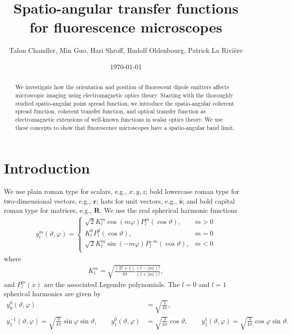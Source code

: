 \documentclass[11pt]{article}
\providecommand{\mb}[1]{\mathbf{#1}}
\begin{document}
\title{\vspace{-2.5em} Spatio-angular transfer functions for fluorescence microscopes\vspace{-1em}}  \author{Talon Chandler, Min Guo, Hari Shroff, Rudolf Oldenbourg, Patrick La Rivi\`ere}
\date{\vspace{-1em}\today\vspace{-1em}}
\maketitle
\begin{abstract}
  We investigate how the orientation and position of fluorescent dipole emitters
  affects microscopic imaging using electromagnetic optics theory. Starting with
  the thoroughly studied spatio-angular point spread function, we introduce the
  spatio-angular coherent spread function, coherent transfer function, and
  optical transfer function as electromagnetic extensions of well-known
  functions in scalar optics theory. We use these concepts to show that
  fluorescence microscopes have a spatio-angular band limit. 
\end{abstract}
\section{Introduction}

We use plain roman type for scalars, e.g., $x, y, z$; bold lowercase roman type
for two-dimensional vectors, e.g., $\mb{r}$; hats for unit vectors, e.g.,
$\mb{\hat{s}}$; and bold capital roman type for matrices, e.g.,
$\mb{R}$. We use the real spherical harmonic functions
\begin{align}
  y_l^m(\vartheta, \varphi) =
  \begin{cases}
    \sqrt{2}K_l^m\cos(m\varphi)P_l^m(\cos\vartheta), & m > 0\\
    K_l^0P_l^0(\cos\vartheta), & m = 0\\
    \sqrt{2}K_l^m\sin(-m\varphi)P_l^{-m}(\cos\vartheta), & m < 0\\
  \end{cases}
\end{align}
where
\begin{align}
  K_l^m = \sqrt{\frac{(2l+1)}{4\pi}\frac{(l-|m|)!}{(l+|m|)!}},
\end{align}
and $P_l^m(x)$ are the associated Legendre polynomials. The $l=0$ and $l=1$
spherical harmonics are given by
\begin{equation}
\begin{aligned}
  y_0^0(\vartheta, \varphi) &= \sqrt{\frac{1}{4\pi}},\\
  y_1^{-1}(\vartheta, \varphi) = \sqrt{\frac{3}{4\pi}}\sin\varphi\sin\vartheta, \hspace{2em} y_1^0(\vartheta, \varphi) &= \sqrt{\frac{3}{4\pi}}\cos\vartheta, \hspace{2em} y_1^1(\vartheta, \varphi) = \sqrt{\frac{3}{4\pi}}\cos\varphi\sin\vartheta. \label{eq:harmonics}
\end{aligned}
\end{equation}
\end{document}
